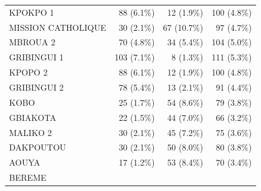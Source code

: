 \begin{table}[!h]
\begin{tabular}{llll}
\multicolumn{1}{l}{\hspace{1em}KPOKPO    1} &
  \multicolumn{1}{r}{88 (6.1\%)} &
  \multicolumn{1}{r}{12 (1.9\%)} &
  \multicolumn{1}{r}{100 (4.8\%)} \\
\multicolumn{1}{l}{\hspace{1em}MISSION  CATHOLIQUE} &
  \multicolumn{1}{r}{30 (2.1\%)} &
  \multicolumn{1}{r}{67 (10.7\%)} &
  \multicolumn{1}{r}{97 (4.7\%)} \\
\multicolumn{1}{l}{\hspace{1em}MBROUA 2} &
  \multicolumn{1}{r}{70 (4.8\%)} &
  \multicolumn{1}{r}{34 (5.4\%)} &
  \multicolumn{1}{r}{104 (5.0\%)} \\
\multicolumn{1}{l}{\hspace{1em}GRIBINGUI 1} &
  \multicolumn{1}{r}{103 (7.1\%)} &
  \multicolumn{1}{r}{8 (1.3\%)} &
  \multicolumn{1}{r}{111 (5.3\%)} \\
\multicolumn{1}{l}{\hspace{1em}KPOPO 2} &
  \multicolumn{1}{r}{88 (6.1\%)} &
  \multicolumn{1}{r}{12 (1.9\%)} &
  \multicolumn{1}{r}{100 (4.8\%)} \\
\multicolumn{1}{l}{\hspace{1em}GRIBINGUI 2} &
  \multicolumn{1}{r}{78 (5.4\%)} &
  \multicolumn{1}{r}{13 (2.1\%)} &
  \multicolumn{1}{r}{91 (4.4\%)} \\
\multicolumn{1}{l}{\hspace{1em}KOBO} &
  \multicolumn{1}{r}{25 (1.7\%)} &
  \multicolumn{1}{r}{54 (8.6\%)} &
  \multicolumn{1}{r}{79 (3.8\%)} \\
\multicolumn{1}{l}{\hspace{1em}GBIAKOTA} &
  \multicolumn{1}{r}{22 (1.5\%)} &
  \multicolumn{1}{r}{44 (7.0\%)} &
  \multicolumn{1}{r}{66 (3.2\%)} \\
\multicolumn{1}{l}{\hspace{1em}MALIKO 2} &
  \multicolumn{1}{r}{30 (2.1\%)} &
  \multicolumn{1}{r}{45 (7.2\%)} &
  \multicolumn{1}{r}{75 (3.6\%)} \\
\multicolumn{1}{l}{\hspace{1em}DAKPOUTOU} &
  \multicolumn{1}{r}{30 (2.1\%)} &
  \multicolumn{1}{r}{50 (8.0\%)} &
  \multicolumn{1}{r}{80 (3.8\%)} \\
\multicolumn{1}{l}{\hspace{1em}AOUYA} &
  \multicolumn{1}{r}{17 (1.2\%)} &
  \multicolumn{1}{r}{53 (8.4\%)} &
  \multicolumn{1}{r}{70 (3.4\%)} \\
\multicolumn{1}{l}{\hspace{1em}BEREME} &

\end{tabular}
\end{table}
